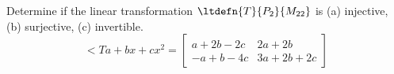 Determine if the linear transformation $\ltdefn{T}{P_2}{M_{22}}$ is (a) injective, (b) surjective, (c) invertible.
%
\begin{equation*}
\lt{T}{a+bx+cx^2}=
\begin{bmatrix}
a+2b-2c & 2a+2b \\
-a+b-4c & 3a+2b+2c
\end{bmatrix}
\end{equation*}